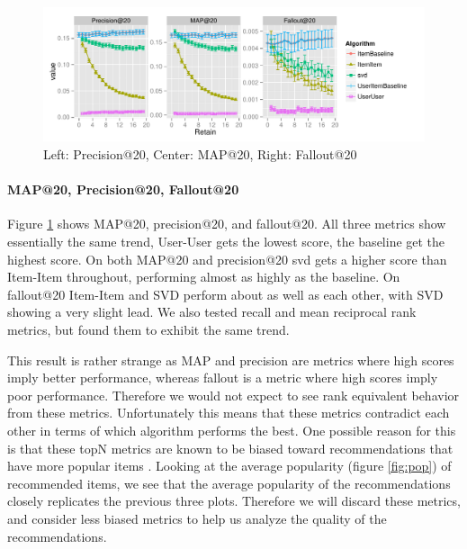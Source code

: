 \documentclass[letterpaper]{sig-alternate}
\begin{document}


\begin{figure}[ht!]
  \centering
  \includegraphics[width=1.05\linewidth]{../lenskit/output/ekstrandTuned20/TopNPrecision.pdf}
  \caption{Left: Precision@20, Center: MAP@20, Right: Fallout@20}
  \label{fig:map}
\end{figure}
\paragraph{MAP@20, Precision@20, Fallout@20}
  Figure \ref{fig:map} shows MAP@20, precision@20, and fallout@20.
  All three metrics show essentially the same trend, User-User gets the lowest score, the baseline get the highest score.
  On both MAP@20 and precision@20 svd gets a higher score than Item-Item throughout, performing almost as highly as the baseline.
  On fallout@20 Item-Item and SVD perform about as well as each other, with SVD showing a very slight lead.
  We also tested recall and mean reciprocal rank metrics, but found them to exhibit the same trend.

  This result is rather strange as MAP and precision are metrics where high scores imply better performance, whereas fallout is a metric where high scores imply poor performance.
  Therefore we would not expect to see rank equivalent behavior from these metrics.
  Unfortunately this means that these metrics contradict each other in terms of which algorithm performs the best.
  One possible reason for this is that these topN metrics are known to be biased toward recommendations that have more popular items \cite{bellogin}.
  Looking at the average popularity (figure \ref{fig:pop}) of recommended items, we see that the average popularity of the recommendations closely replicates the previous three plots.
  Therefore we will discard these metrics, and consider less biased metrics to help us analyze the quality of the recommendations.
\end{document}

